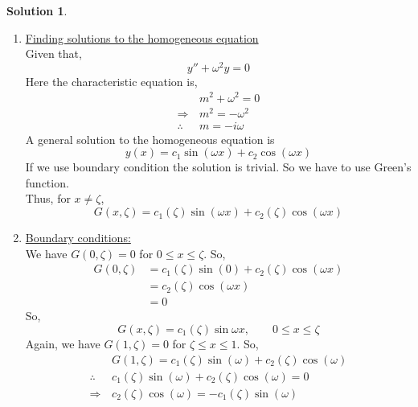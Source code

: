 \documentclass[12pt,a4paper]{article}
\theoremstyle{remark}
\theoremstyle{definition}
\newtheorem*{soln}{Solution}
\begin{document}
\begin{soln}
    \begin{enumerate}
        \item \underline{Finding solutions to the homogeneous equation}\\
              Given that,
              \begin{equation}
                  y''+\omega^2y=0 \label{eq:green1.1}
              \end{equation}
              Here the characteristic equation is,
              \begin{align*}
                                & m^2+\omega^2=0 \\
                  \Rightarrow\, & m^2=-\omega^2  \\
                  \therefore\,  & m=-i\omega
              \end{align*}
              A general solution to the homogeneous equation is
              \[y(x)=c_1\sin(\omega x)+c_2\cos(\omega x)\]
              If we use boundary condition the solution is trivial. So we have to use Green's function.\\
              Thus, for $ x\neq \zeta $,
              \begin{equation}
                  G(x,\zeta)=c_1(\zeta)\sin(\omega x)+c_2(\zeta)\cos(\omega x)\label{eq:green1.2}
              \end{equation}
        \item \underline{Boundary conditions:}\\
              We have $ G(0,\zeta)=0 $ for $ 0\leq x\leq \zeta $. So,
              \begin{align*}
                  G(0,\zeta) & =c_1(\zeta)\sin(0)+c_2(\zeta)\cos(\omega x) \\
                             & =c_2(\zeta)\cos(\omega x)                   \\
                             & =0
              \end{align*}
              So,
              \[G(x,\zeta)=c_1(\zeta)\sin{\omega x},\qquad0\leq x\leq \zeta\]
              Again, we have $ G(1,\zeta)=0 $ for $ \zeta\leq x\leq 1 $. So,
              \begin{align*}
                                & G(1,\zeta)=c_1(\zeta)\sin(\omega)+c_2(\zeta)\cos(\omega) \\
                  \therefore\,  & c_1(\zeta)\sin(\omega)+c_2(\zeta)\cos(\omega)=0          \\
                  \Rightarrow\, & c_2(\zeta)\cos(\omega)=-c_1(\zeta)\sin(\omega)           \\

\end{align*}
\end{enumerate}
\end{soln}
\end{document}
